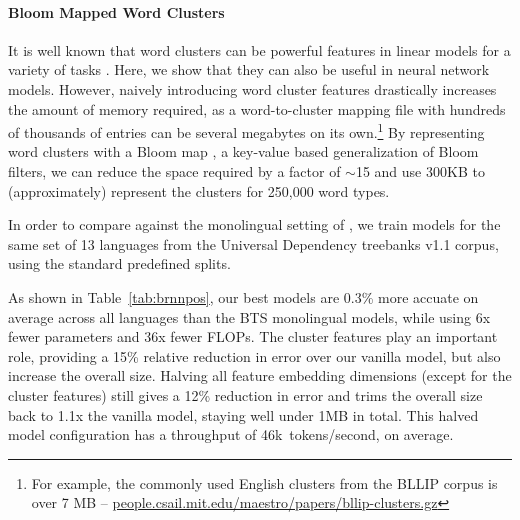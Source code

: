 \documentclass[11pt,letterpaper]{article}
\begin{document}
\paragraph{Bloom Mapped Word Clusters}
\label{sec:approxmap}
It is well known that word clusters can be powerful features in linear models for a variety of tasks \cite{koo2008simple,Turian:2010:wordreps}.
Here, we show that they can also be useful in neural network models.
However, naively introducing word cluster features drastically increases
the amount of memory required,
as a word-to-cluster mapping file with hundreds of thousands of entries
can be several megabytes on its own.\footnote{For example, the commonly
used English clusters from the BLLIP corpus is over 7 MB -- {\footnotesize\url{people.csail.mit.edu/maestro/papers/bllip-clusters.gz}}}
By representing word clusters with a Bloom map \cite{talbot2008bloom},
a key-value based generalization of Bloom filters,
we can reduce the space required by a factor of $\sim$15
and use 300KB to (approximately) represent the clusters for 250,000 word types.

\begin{table}
  \caption{%
    POS tagging. 
    Embedded word clusters improves accuracy and allows the use of smaller
    embedding dimensions.
    }
\label{tab:brnnpos}
\end{table}

In order to compare against the monolingual setting of ,
we train models for the same set of 13 languages from the Universal Dependency treebanks v1.1 \cite{UD1lrec2016} corpus, using the standard predefined splits.

As shown in Table~\ref{tab:brnnpos},
our best models are 0.3\% more accuate on average across all languages than the BTS monolingual models, while using 6x fewer parameters and 36x fewer FLOPs. 
The cluster features play an important role, providing
a 15\% relative reduction in error over our vanilla model, but also increase the overall size.
Halving all feature embedding dimensions (except for the cluster features)
still gives a 12\% reduction in error
and trims the overall size back to 1.1x the vanilla model, staying well under 1MB in total.
This halved model configuration has a throughput of 46k~tokens/second, on average.
\end{document}
